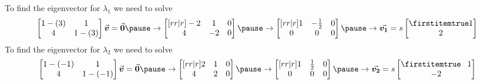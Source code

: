 \documentclass{beamer}
\begin{document}
\begin{frame}
\begin{example}
\vspace{1mm}
To find the eigenvector for $\lambda_1$ we need to solve
\begin{equation*}
\begin{bmatrix}
1-(3) & 1 \\
4 & 1-(3) \\
\end{bmatrix}\vect{v}=\vect{0}\pause
\rightarrow
\begin{bmatrix}[rr|r]
-2 & 1 & 0 \\
4 & -2 & 0
\end{bmatrix}\pause
\rightarrow
\begin{bmatrix}[rr|r]
1 & -\tfrac{1}{2} & 0 \\
0 & 0 & 0
\end{bmatrix}\pause
\rightarrow
\vect{v_1}=s\bvector{1,2}
\end{equation*}\pause
To find the eigenvector for $\lambda_2$ we need to solve
\begin{equation*}
\begin{bmatrix}
1-(-1) & 1 \\
4 & 1-(-1) \\
\end{bmatrix}\vect{v}=\vect{0}\pause
\rightarrow
\begin{bmatrix}[rr|r]
2 & 1 & 0 \\
4 & 2 & 0
\end{bmatrix}\pause
\rightarrow
\begin{bmatrix}[rr|r]
1 & \tfrac{1}{2} & 0 \\
0 & 0 & 0
\end{bmatrix}\pause
\rightarrow
\vect{v_2}=s\bvector{\+1,-2}
\end{equation*}

\vspace{-4mm}
\end{example}
\end{frame}
\end{document}
